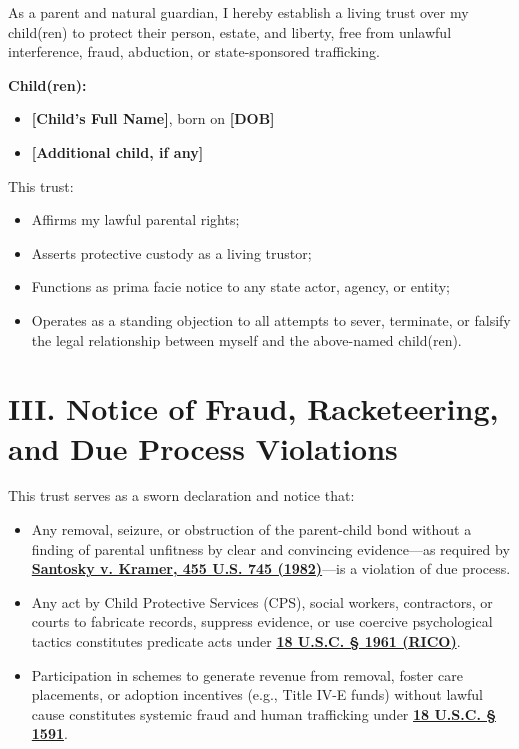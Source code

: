 \documentclass[12pt,letterpaper]{article}
\begin{document}
As a parent and natural guardian, I hereby establish a living trust over my child(ren) to protect their person, estate, and liberty, free from unlawful interference, fraud, abduction, or state-sponsored trafficking.

\textbf{Child(ren):}
\begin{itemize}
  \item \textbf{[Child’s Full Name]}, born on \textbf{[DOB]}
  \item \textbf{[Additional child, if any]}
\end{itemize}

This trust:
\begin{itemize}
    \item Affirms my lawful parental rights;
    \item Asserts protective custody as a living trustor;
    \item Functions as prima facie notice to any state actor, agency, or entity;
    \item Operates as a standing objection to all attempts to sever, terminate, or falsify the legal relationship between myself and the above-named child(ren).
\end{itemize}

\section*{III. Notice of Fraud, Racketeering, and Due Process Violations}

This trust serves as a sworn declaration and notice that:

\begin{itemize}
  \item Any removal, seizure, or obstruction of the parent-child bond without a finding of parental unfitness by clear and convincing evidence—as required by \href{https://supreme.justia.com/cases/federal/us/455/745/}{\textbf{Santosky v. Kramer, 455 U.S. 745 (1982)}}—is a violation of due process.
  \item Any act by Child Protective Services (CPS), social workers, contractors, or courts to fabricate records, suppress evidence, or use coercive psychological tactics constitutes predicate acts under \href{https://www.law.cornell.edu/uscode/text/18/1961}{\textbf{18 U.S.C. § 1961 (RICO)}}.
  \item Participation in schemes to generate revenue from removal, foster care placements, or adoption incentives (e.g., Title IV-E funds) without lawful cause constitutes systemic fraud and human trafficking under \href{https://www.law.cornell.edu/uscode/text/18/1591}{\textbf{18 U.S.C. § 1591}}.
\end{itemize}
\end{document}

